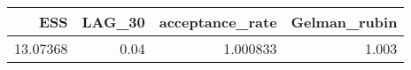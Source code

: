 \begin{longtable}{rrrr}
\toprule
ESS & LAG\_30 & acceptance\_rate & Gelman\_rubin \\ 
\midrule
13.07368 & 0.04 & 1.000833 & 1.003 \\ 
\bottomrule
\end{longtable}

